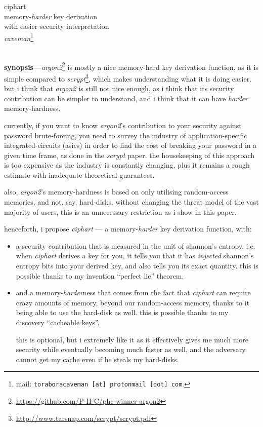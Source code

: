 \documentclass[twocolumn]{article}
\begin{document}
\SetInd{.15em}{1em}

\begin{center}
\Huge
ciphart\\
\LARGE
memory-\emph{harder} key derivation \\
with easier security interpretation\\
\normalsize
\emph{caveman}\footnote{mail: \texttt{toraboracaveman [at] protonmail [dot]
com}.}\\
\footnotesize
\DTMnow\\
\end{center}

\noindent\textbf{synopsis---}\emph{argon2}\footnote{\url{https://github.com/P-H-C/phc-winner-argon2}}
is mostly a nice memory-hard key derivation function, as it is simple
compared to
\emph{scrypt}\footnote{\url{http://www.tarsnap.com/scrypt/scrypt.pdf}},
which makes understanding what it is doing easier.  but i think that
\emph{argon2} is still not nice enough, as i think that its security
contribution can be simpler to understand, and i think that it can have
\emph{harder} memory-hardness.

currently, if you want to know \emph{argon2}'s contribution to your
security against password brute-forcing, you need to survey the industry of
application-specific integrated-circuits (asics) in order to find the cost
of breaking your password in a given time frame, as done in the
\emph{scrypt} paper.  the housekeeping of this approach is too expensive as
the industry is constantly changing, plus it remains a rough estimate with
inadequate theoretical guarantees.

also, \emph{argon2}'s memory-hardness is based on only utilising
random-access memories, and not, say, hard-disks.  without changing the
threat model of the vast majority of users, this is an unnecessary
restriction as i show in this paper.

henceforth, i propose \emph{ciphart} --- a memory-\emph{harder} key
derivation function, with:
\begin{itemize}
    \item a security contribution that is measured in the unit of shannon's
    entropy.  i.e. when \emph{ciphart} derives a key for you, it tells you
    that it has \emph{injected} shannon's entropy bits into your derived
    key, and also tells you its exact quantity.  this is possible thanks to
    my invention ``perfect lie'' theorem.
    \item and a memory-\emph{harder}ness that comes from the fact that
    \emph{ciphart} can require crazy amounts of memory, beyond our
    random-access memory, thanks to it being able to use the hard-disk as
    well.  this is possible thanks to my discovery ``cacheable keys''.

    this is optional, but i extremely like it as it effectively gives me
    much more security while eventually becoming much faster as well, and
    the adversary cannot get my cache even if he steals my hard-disks.
\end{itemize}
\end{document}

